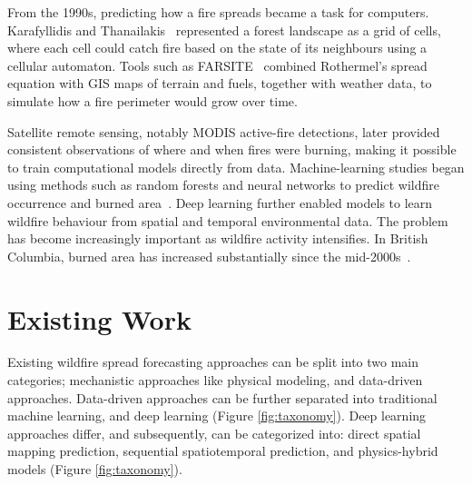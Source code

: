 \documentclass[sigconf]{acmart}
\begin{document}
From the 1990s, predicting how a fire spreads became a task for computers. Karafyllidis and Thanailakis~\cite{KARAFYLLIDIS1997} represented a forest landscape as a grid of cells, where each cell could catch fire based on the state of its neighbours using a cellular automaton. Tools such as FARSITE~\cite{FINNEY1998} combined Rothermel's spread equation with GIS maps of terrain and fuels, together with weather data, to simulate how a fire perimeter would grow over time.

Satellite remote sensing, notably MODIS active-fire detections, later provided consistent observations of where and when fires were burning, making it possible to train computational models directly from data. Machine-learning studies began using methods such as random forests and neural networks to predict wildfire occurrence and burned area~\cite{JAIN2020}. Deep learning further enabled models to learn wildfire behaviour from spatial and temporal environmental data. The problem has become increasingly important as wildfire activity intensifies. In British Columbia, burned area has increased substantially since the mid-2000s~\cite{PARISIEN2023}.

\section{Existing Work}
Existing wildfire spread forecasting approaches can be split into two main categories; mechanistic approaches like physical modeling, and data-driven approaches. Data-driven approaches can be further separated into traditional machine learning, and deep learning (Figure \ref{fig:taxonomy}). Deep learning approaches differ, and subsequently, can be categorized into: direct spatial mapping prediction, sequential spatiotemporal prediction, and physics-hybrid models (Figure \ref{fig:taxonomy}).
\end{document}
